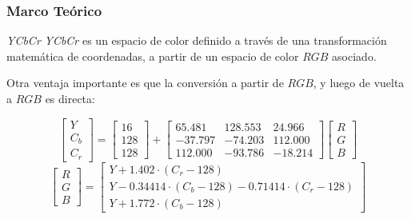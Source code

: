\documentclass[usenames,dvipsnames]{beamer}
\begin{document}
\begin{frame} 
\frametitle{Marco Teórico} 
\begin{exampleblock}{\textit{YCbCr}}
\textit{YCbCr} es un espacio de color definido a través de una transformación matemática de coordenadas, a partir de un espacio de color $RGB$ asociado.

Otra ventaja importante es que la conversión a partir de $RGB$, y luego de vuelta a $RGB$ es directa:
\end{exampleblock}
\vspace{-0.5cm}
\begin{equation}
\begin{bmatrix}
Y \\
C_b \\
C_r 
\end{bmatrix} =
\begin{bmatrix}
16  \\
128 \\
128
\end{bmatrix}
+
\begin{bmatrix}
65.481 & 128.553 & 24.966 \\
-37.797 & -74.203 & 112.000 \\
112.000 & -93.786 & -18.214 
\end{bmatrix}
\begin{bmatrix}
R \\
G \\
B 
\end{bmatrix}
\end{equation}
\begin{equation}
\begin{bmatrix}
R \\
G \\
B 
\end{bmatrix} =
\begin{bmatrix}
Y + 1.402 \cdot (C_r - 128) \\
Y -0.34414 \cdot (C_b - 128) - 0.71414 \cdot (C_r - 128) \\
Y + 1.772 \cdot  (C_b - 128) 
\end{bmatrix}
\end{equation}
\centering

\end{frame}
\end{document}

